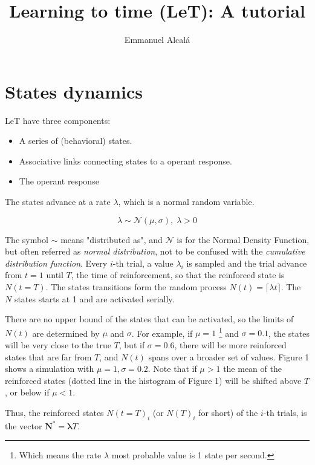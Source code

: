\documentclass[11pt]{article}
\title{Learning to time (LeT): A tutorial}
\author{Emmanuel Alcalá}
\begin{document}
    \maketitle

    \section{States dynamics}

LeT have three components:

    \begin{itemize}
        \item A series of (behavioral) states.
        \item Associative links connecting states to a operant response.
        \item The operant response
    \end{itemize}

The states advance at a rate $\lambda$, which is a normal random variable.

    \[
        \lambda \sim \mathcal{N} (\mu, \sigma),\; \lambda > 0
    \]

    The symbol $\sim$ means "distributed as", and $\mathcal{N}$ is for the Normal Density Function, but often referred
    as \textit{normal distribution}, not to be confused with the \textit{cumulative distribution function}.
    Every $i$-th trial, a value $\lambda_i$ is sampled and the trial advance from $t = 1$ until $T$, the time of reinforcement, so that the
reinforced state is $N(t = T)$.
    The states transitions form the random process $N(t) = \lceil {\lambda t} \rceil$.
    The $N$ states starts at 1 and are activated serially.

There are no upper bound of the states that can be activated, so the limits of $N(t)$ are determined by $\mu$ and $\sigma$.
For example, if $\mu = 1$ \footnote{Which means the rate $\lambda$ most probable value is 1 state per second.} and $\sigma = 0.1$, the states will be very close to the true $T$, but if $\sigma = 0.6$,
there will be more reinforced states that are far from $T$, and $N(t)$ spans over a broader set of values.
Figure 1 shows a simulation with $\mu=1,\sigma=0.2$.
    Note that if $\mu > 1$ the mean of the reinforced states (dotted line in the histogram of Figure 1) will be shifted above $T$, or below if $\mu < 1$.

Thus, the reinforced states $N(t = T)_i$ (or $N(T)_i$ for short) of the $i$-th trials, is the vector
$\mathbf{N^*} = \boldsymbol{\lambda} T$.
\end{document}
